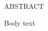 \chapter*{}
\begin{center}
    \Large{ABSTRACT}\\
    \vspace{1.5\baselineskip}
\end{center}

Body text

\vspace*{0.3cm}
